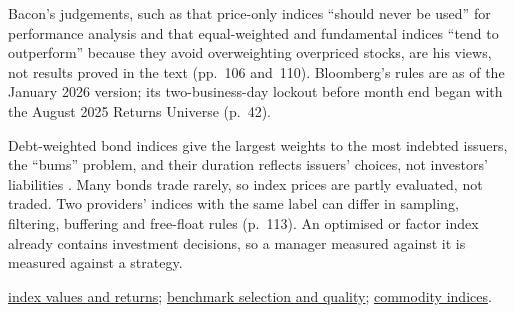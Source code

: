 \begin{qfdefinition}
 Bacon's judgements, such as that price-only indices ``should never be used'' for performance analysis and that equal-weighted and fundamental indices ``tend to outperform'' because they avoid overweighting overpriced stocks, are his views, not results proved in the text (pp.~106 and~110). Bloomberg's rules are as of the January 2026 version; its two-business-day lockout before month end began with the August 2025 Returns Universe (p.~42).

 Debt-weighted bond indices give the largest weights to the most indebted issuers, the ``bums'' problem, and their duration reflects issuers' choices, not investors' liabilities \citep[p.~112]{wide-bacon-attribution}. Many bonds trade rarely, so index prices are partly evaluated, not traded. Two providers' indices with the same label can differ in sampling, filtering, buffering and free-float rules (p.~113). An optimised or factor index already contains investment decisions, so a manager measured against it is measured against a strategy.

 \hyperref[meth:index-value-return-calculation]{index values and returns}; \hyperref[meth:benchmark-selection-quality]{benchmark selection and quality}; \hyperref[def:commodity-indices-risk-return]{commodity indices}.

\end{qfdefinition}
